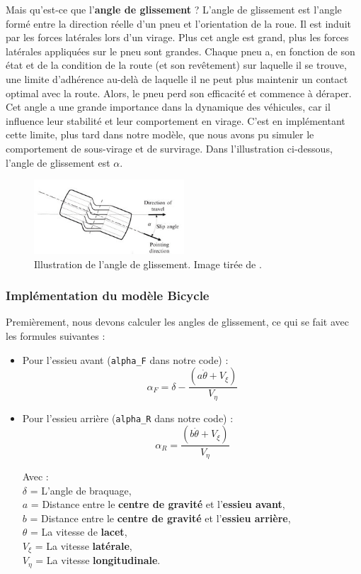 Mais qu'est-ce que l'\textbf{angle de glissement} ? L'angle de glissement est l'angle formé entre la direction réelle d'un pneu et l'orientation de la roue. Il est induit par les forces latérales lors d'un virage. Plus cet angle est grand, plus les forces latérales appliquées sur le pneu sont grandes. Chaque pneu a, en fonction de son état et de la condition de la route (et son revêtement) sur laquelle il se trouve, une limite d'adhérence au-delà de laquelle il ne peut plus maintenir un contact optimal avec la route. Alors, le pneu perd son efficacité et commence à déraper. Cet angle a une grande importance dans la dynamique des véhicules, car il influence leur stabilité et
leur comportement en virage.
C'est en implémentant cette limite, plus tard dans notre modèle, que nous avons pu simuler le comportement de sous-virage et de survirage.
Dans l'illustration ci-dessous, l'angle de glissement est $\alpha$.
\begin{figure}[h]
    \centering
    \includegraphics[width=0.5\textwidth]{Etape2/slip-angle.jpeg}
    \caption{Illustration de l'angle de glissement. Image tirée de \cite{slip-angle}.}
    \label{fig:bicycle_model}
\end{figure}

\subsubsection{Implémentation du modèle Bicycle}
Premièrement, nous devons calculer les angles de glissement, ce qui se fait avec les formules suivantes :

\begin{itemize}
    \item Pour l'essieu avant (\texttt{alpha\_F} dans notre code) :
    $$\alpha_F = \delta - \frac{(a \dot{\theta}+V_{\xi})}{V_\eta}$$
    \item Pour l'essieu arrière (\texttt{alpha\_R} dans notre code) :
    $$\alpha_R = \frac{(b \dot{\theta}+V_{\xi})}{V_\eta} $$

    Avec :\\
    $\delta$ = L'angle de braquage, \\
    $a$ = Distance entre le \textbf{centre de gravité} et l'\textbf{essieu avant},\\
    $b$ = Distance entre le \textbf{centre de gravité} et l'\textbf{essieu arrière},\\
    $\theta$ = La vitesse de \textbf{lacet}, \\
    $V_\xi$ = La vitesse \textbf{latérale}, \\
    $V_\eta$ = La vitesse \textbf{longitudinale}. \\
\end{itemize}

